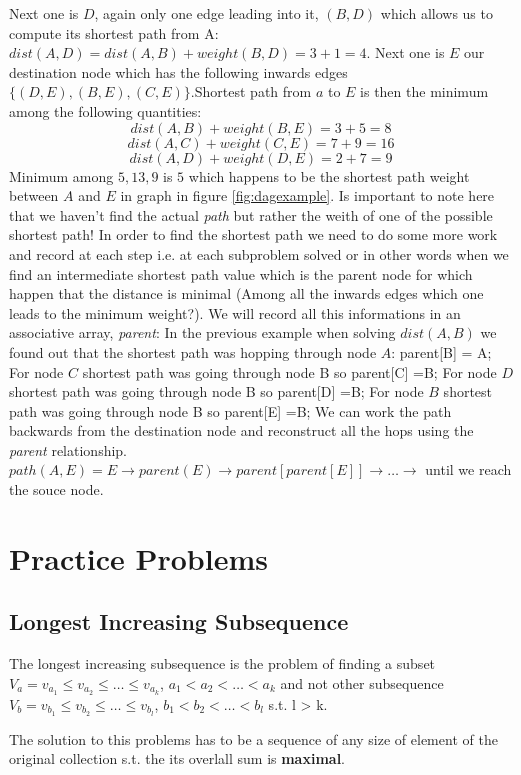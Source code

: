 Next one is $D$, again only one edge leading into it, $(B,D)$ which allows us to compute its shortest path from A: $dist(A,D) = dist(A,B) + weight(B,D) = 3 +1 =4$.
Next one is $E$ our destination node which has the following inwards edges $\{(D,E),(B,E), (C,E)\}$.Shortest path from $a$ to $E$ is then 
the minimum among the following quantities:
\[
	dist(A,B) + weight(B,E) = 3+5=8
\]
\[
	dist(A,C) + weight(C,E) = 7 + 9 = 16
\]
\[
	dist(A,D) + weight(D,E) = 2 +7 =9
\]
Minimum among $5,13,9$ is $5$ which happens to be the shortest path weight between $A$ and $E$ in graph in figure \ref{fig:dagexample}.
Is important to note here that we haven't find the actual \textit{path} but rather the weith of one of the possible shortest path! In order to find the shortest path we need to do some more work and record at each step i.e. at each subproblem solved or in other words when we find an intermediate shortest path value which is the parent node for which happen that the distance is minimal (Among all the inwards edges which one leads to the minimum weight?).
We will record all this informations in an associative array, \textit{parent}:
In the previous example when solving $dist(A,B)$ we found out that the shortest path was hopping through node $A$:  parent[B] = A;
For node $C$ shortest path was going through node B so parent[C] =B;
For node $D$ shortest path was going through node B so parent[D] =B;
For node $B$ shortest path was going through node B so parent[E] =B;
We can work the path backwards from the destination node and reconstruct all the hops using the \textit{parent} relationship.
$path(A,E) = E \rightarrow parent(E) \rightarrow  parent[parent[E]] \rightarrow  \ldots \rightarrow $ until we reach the souce node.
\section{Practice Problems}

\subsection{Longest Increasing Subsequence}
The longest increasing subsequence is the problem of finding a subset $V_a=v_{a_1} \leq v_{a_2} \leq\ldots \leq v_{a_k}$, $a_1 < a_2 < \ldots < a_k$ and not other subsequence $V_b=v_{b_1}\leq v_{b_2}\leq \ldots \leq v_{b_l}$, $b_1 < b_2 < \ldots < b_l$ s.t. l > k.

The solution to this problems has to be a sequence of any size of element of the original collection s.t. the its overlall sum is \textbf{maximal}.

